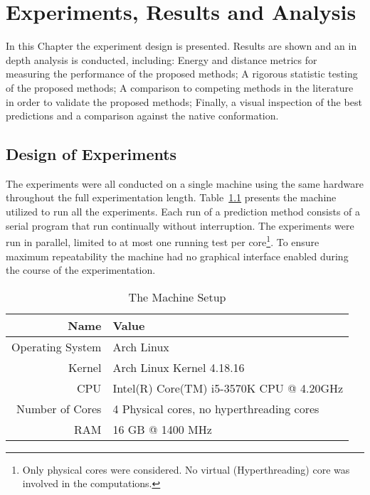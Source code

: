 \chapter{Experiments, Results and Analysis}\label{chap:experiments_and_results}

In this Chapter the experiment design is presented. Results are shown and an in
depth analysis is conducted, including: Energy and distance metrics for
measuring the performance of the proposed methods; A rigorous statistic testing
of the proposed methods; A comparison to competing methods in the literature in
order to validate the proposed methods; Finally, a visual inspection of the
best predictions and a comparison against the native conformation.

\section{Design of Experiments}\label{sec:design_of_experiments}

The experiments were all conducted on a single machine using the same hardware
throughout the full experimentation length. Table~\ref{tab:machine-setup}
presents the machine utilized to run all the experiments. Each run of a
prediction method consists of a serial program that run continually without
interruption.  The experiments were run in parallel, limited to at most one
running test per core\footnote{Only physical cores were considered. No virtual
(Hyperthreading) core was involved in the computations.}.  To ensure maximum
repeatability the machine had no graphical interface enabled during the course
of the experimentation.

\begin{table}[th]
    \centering
    \begin{tabular}{r|l} \hline \hline
        Name & Value \\ \hline \hline
        Operating System & Arch Linux \\ \hline
        Kernel &  Arch Linux Kernel 4.18.16 \\ \hline
        CPU & Intel(R) Core(TM) i5-3570K CPU @ 4.20GHz \\ \hline
        Number of Cores & 4 Physical cores, no hyperthreading cores \\ \hline
        RAM & 16 GB @ 1400 MHz \\ \hline \hline
    \end{tabular}
    \caption{The Machine Setup}
    \label{tab:machine-setup}
\end{table}


